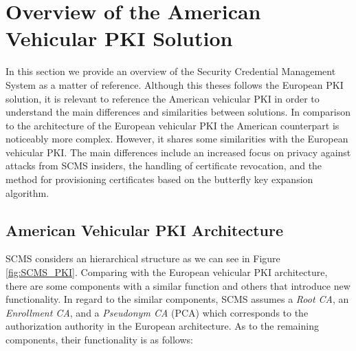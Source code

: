 \section{Overview of the American Vehicular PKI Solution} \label{us_pki}
In this section we provide an overview of the Security Credential Management System as a matter of reference. Although this theses follows the European PKI solution, it is relevant to reference the American vehicular PKI in order to understand the main differences and similarities between solutions.
In comparison to the architecture of the European vehicular PKI the American counterpart is noticeably more complex. However, it shares some similarities with the European vehicular PKI. The main differences include an increased focus on privacy against attacks from SCMS insiders, the handling of certificate revocation, and the method for provisioning certificates based on the butterfly key expansion algorithm. 

\subsection{American Vehicular PKI Architecture}
\bigbreak
SCMS considers an hierarchical structure as we can see in Figure \ref{fig:SCMS_PKI}. Comparing with the European vehicular PKI architecture, there are some components with a similar function and others that introduce new functionality. In regard to the similar components, SCMS assumes a \textit{Root CA}, an \textit{Enrollment CA}, and a \textit{Pseudonym CA} (PCA) which corresponds to the authorization authority in the European architecture. As to the remaining components, their functionality is as follows:

